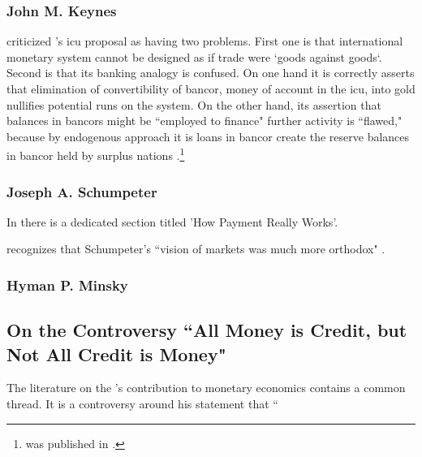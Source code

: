 \subsubsection{John M. Keynes}

\cite[vol.XXV, p.~44]{keynes1980}

\cite{wray1999} criticized \citeauthor{keynes1980}'s \ac{icu} proposal as having two problems. First one is that international monetary system cannot be designed as if trade were `goods against goods`. Second is that its banking analogy is confused. On one hand it is correctly asserts that elimination of convertibility of bancor, money of account in the \ac{icu}, into gold nullifies potential runs on the system. On the other hand, its assertion that balances in bancors might be ``employed to finance" further activity is ``flawed," because by endogenous approach it is loans in bancor create the reserve balances in bancor held by surplus nations \citep[p.~194-198, footnote 16]{wray1999}.\footnote{\cite{wray1999} was published in \cite{harvey1999}.}

%
%
\subsubsection{Joseph A. Schumpeter}

In \citep{schumpeter2014} there is a dedicated section titled 'How Payment Really Works'.

\citeauthor{wray2009} recognizes that Schumpeter's ``vision of markets was much more orthodox" \citep[p.~810]{wray2009}.

%
%
\subsubsection{Hyman P. Minsky}

\subsection{On the Controversy ``All Money is Credit, but Not All Credit is Money"}

The literature on the \citeauthor{innes1913}'s contribution to monetary economics contains a common thread. It is a controversy around his statement that `` 